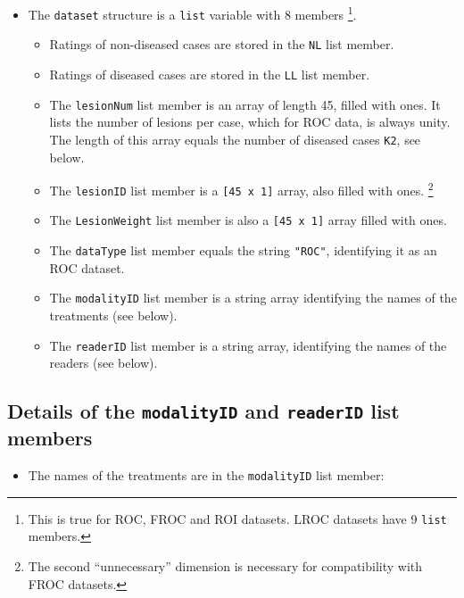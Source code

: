 \documentclass[]{book}
\providecommand{\tightlist}{%
  \setlength{\itemsep}{0pt}\setlength{\parskip}{0pt}}
\let\rmarkdownfootnote\footnote%
\def\footnote{\protect\rmarkdownfootnote}
\begin{document}
\begin{itemize}
\tightlist
\item
  The \texttt{dataset} structure is a \texttt{list} variable with 8 members \footnote{This is true for ROC, FROC and ROI datasets. LROC datasets have 9 \texttt{list} members.}.

  \begin{itemize}
  \tightlist
  \item
    Ratings of non-diseased cases are stored in the \texttt{NL} list member.
  \item
    Ratings of diseased cases are stored in the \texttt{LL} list member.
  \item
    The \texttt{lesionNum} list member is an array of length 45, filled with ones. It lists the number of lesions per case, which for ROC data, is always unity. The length of this array equals the number of diseased cases \texttt{K2}, see below.
  \item
    The \texttt{lesionID} list member is a \texttt{{[}45\ x\ 1{]}} array, also filled with ones. \footnote{The second ``unnecessary'' dimension is necessary for compatibility with FROC datasets.}
  \item
    The \texttt{LesionWeight} list member is also a \texttt{{[}45\ x\ 1{]}} array filled with ones.
  \item
    The \texttt{dataType} list member equals the string \texttt{"ROC"}, identifying it as an ROC dataset.
  \item
    The \texttt{modalityID} list member is a string array identifying the names of the treatments (see below).
  \item
    The \texttt{readerID} list member is a string array, identifying the names of the readers (see below).
  \end{itemize}
\end{itemize}

\hypertarget{details-of-the-modalityid-and-readerid-list-members}{%
\subsection{\texorpdfstring{Details of the \texttt{modalityID} and \texttt{readerID} list members}{Details of the modalityID and readerID list members}}\label{details-of-the-modalityid-and-readerid-list-members}}

\begin{itemize}
\tightlist
\item
  The names of the treatments are in the \texttt{modalityID} list member:
\end{itemize}
\end{document}
